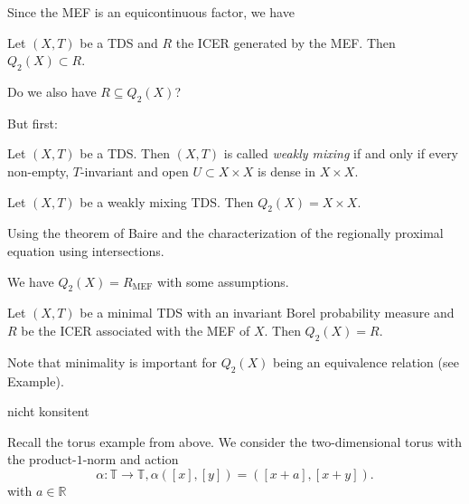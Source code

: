 \begin{frame}
  Since the MEF is an equicontinuous factor, we have
  \begin{corollary}
    Let $(X, T)$ be a TDS and $R$ the ICER generated by the MEF.
    Then $Q_2(X) \subset R$.
  \end{corollary}
  Do we also have $R \subseteq Q_2(X)$?
\end{frame}

\begin{frame}
  But first:
  \begin{definition}
    Let $(X,T)$ be a TDS. Then $(X,T)$ is called \emph{weakly mixing} if and only if every non-empty, $T$-invariant and open $U\subset X \times X$ is dense in $X \times X$.
  \end{definition}
  \begin{proposition}
    Let $(X,T)$ be a weakly mixing TDS. Then $Q_2(X) = X \times X$.
  \end{proposition}
  Using the theorem of Baire and the characterization of the
  regionally proximal equation using intersections.
\end{frame}

\begin{frame}
  We have $Q_2(X) = R_{\text{MEF}}$ with some assumptions.
\begin{theorem}
  Let $(X, T)$ be a minimal TDS with an invariant Borel probability measure
  and $R$ be the ICER associated with the MEF of $X$.
  Then $Q_2(X) = R$.
\end{theorem}
  Note that minimality is important for $Q_2(X)$ being an equivalence relation (see Example).
\end{frame}

\begin{frame}
  {\color{red} nicht konsitent}
  \begin{example}
    Recall the torus example from above.
    We consider the two-dimensional torus with the product-$1$-norm
    and action
    \[ \alpha : \mathbb{T} \to \mathbb{T}, \alpha([x], [y]) = ([x + a], [x + y]). \]
    with $a \in \mathbb{R}$

  \end{example}
\end{frame}
